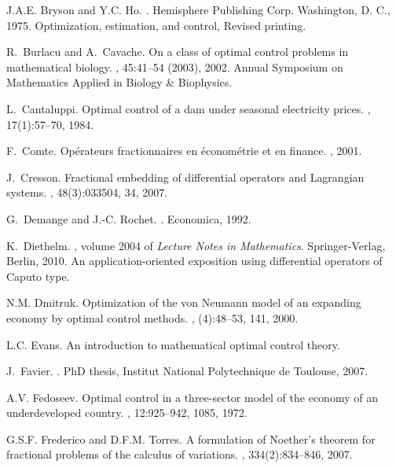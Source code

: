 \documentclass[english,11pt,reqno]{smfart}
\begin{document}
\begin{thebibliography}{10}
J.A.E. Bryson and Y.C. Ho.
.
\newblock Hemisphere Publishing Corp. Washington, D. C., 1975.
\newblock Optimization, estimation, and control, Revised printing.

R.~Burlacu and A.~Cavache.
\newblock On a class of optimal control problems in mathematical biology.
, 45:41--54 (2003), 2002.
\newblock Annual Symposium on Mathematics Applied in Biology \& Biophysics.

L.~Cantaluppi.
\newblock Optimal control of a dam under seasonal electricity prices.
, 17(1):57--70, 1984.

F.~Comte.
\newblock Op\'erateurs fractionnaires en \'econom\'etrie et en finance.
, 2001.

J.~Cresson.
\newblock Fractional embedding of differential operators and {L}agrangian
  systems.
, 48(3):033504, 34, 2007.

G.~Demange and J.-C. Rochet.
.
\newblock Economica, 1992.

K.~Diethelm.
, volume 2004
  of {\em Lecture Notes in Mathematics}.
\newblock Springer-Verlag, Berlin, 2010.
\newblock An application-oriented exposition using differential operators of
  Caputo type.

N.M. Dmitruk.
\newblock Optimization of the von {N}eumann model of an expanding economy by
  optimal control methods.
, (4):48--53, 141, 2000.

L.C. Evans.
\newblock An introduction to mathematical optimal control theory.

J.~Favier.
.
\newblock PhD thesis, Institut National Polytechnique de Toulouse, 2007.

A.V. Fedoseev.
\newblock Optimal control in a three-sector model of the economy of an
  underdeveloped country.
, 12:925--942, 1085, 1972.

G.S.F. Frederico and D.F.M. Torres.
\newblock A formulation of {N}oether's theorem for fractional problems of the
  calculus of variations.
, 334(2):834--846, 2007.


\end{thebibliography}
\end{document}
